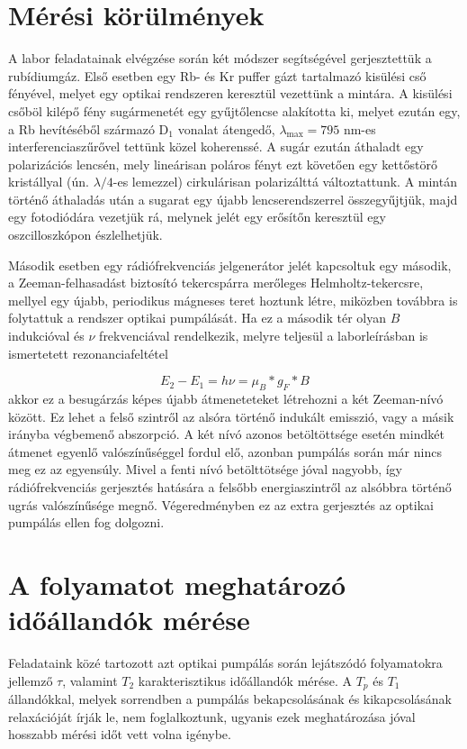 \begin{multicols}{2}
\section{Mérési körülmények}
A labor feladatainak elvégzése során két módszer segítségével gerjesztettük a rubídiumgáz. Első esetben egy Rb- és Kr puffer gázt tartalmazó kisülési cső fényével, melyet egy optikai rendszeren keresztül vezettünk a mintára. A kisülési csőböl kilépő fény sugármenetét egy gyűjtőlencse alakította ki, melyet ezután egy, a Rb hevítéséből származó D$_{1}$ vonalat átengedő, $\lambda_{\text{max}} = 795$ nm-es interferenciaszűrővel tettünk közel koherenssé. A sugár ezután áthaladt egy polarizációs lencsén, mely lineárisan poláros fényt ezt követően egy kettőstörő kristállyal (ún. $\lambda/4$-es lemezzel) cirkulárisan polarizálttá változtattunk. A mintán történő áthaladás után a sugarat egy újabb lencserendszerrel összegyűjtjük, majd egy fotodiódára vezetjük rá, melynek jelét egy erősítőn keresztül egy oszcilloszkópon észlelhetjük. \par
Második esetben egy rádiófrekvenciás jelgenerátor jelét kapcsoltuk egy második, a Zeeman-felhasadást biztosító tekercspárra merőleges Helmholtz-tekercsre, mellyel egy újabb, periodikus mágneses teret hoztunk létre, miközben továbbra is folytattuk a rendszer optikai pumpálását. Ha ez a második tér olyan $B$ indukcióval és $\nu$ frekvenciával rendelkezik, melyre teljesül a laborleírásban is ismertetett rezonanciafeltétel

\begin{equation} \label{eq:1}
E_{2} - E_{1}
=
h \nu
=
\mu_{B} * g_{F} * B
\end{equation}
akkor ez a besugárzás képes újabb átmeneteteket létrehozni a két Zeeman-nívó között. Ez lehet a felső szintről az alsóra történő indukált emisszió, vagy a másik irányba végbemenő abszorpció. A két nívó azonos betöltöttsége esetén mindkét átmenet egyenlő valószínűséggel fordul elő, azonban pumpálás során már nincs meg ez az egyensúly. Mivel a fenti nívó betölttötsége jóval nagyobb, így rádiófrekvenciás gerjesztés hatására a felsőbb energiaszintről az alsóbbra történő ugrás valószínűsége megnő. Végeredményben ez az extra gerjesztés az optikai pumpálás ellen fog dolgozni.

\section{A folyamatot meghatározó időállandók mérése}
Feladataink közé tartozott azt optikai pumpálás során lejátszódó folyamatokra jellemző $\tau$, valamint $T_{2}$ karakterisztikus időállandók mérése. A $T_{p}$ és $T_{1}$ állandókkal, melyek sorrendben a pumpálás bekapcsolásának és kikapcsolásának relaxációját írják le, nem foglalkoztunk, ugyanis ezek meghatározása jóval hosszabb mérési időt vett volna igénybe.

\end{multicols}
